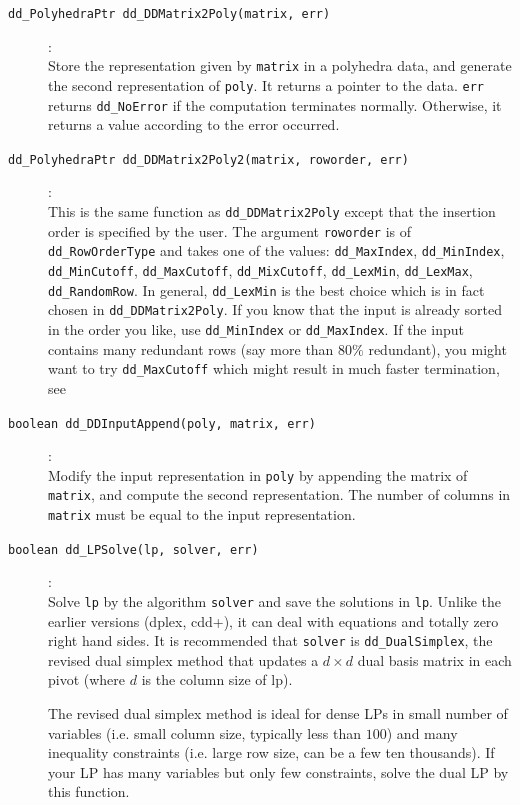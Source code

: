 \documentclass[11pt]{article}
\newcommand {\0} {{\bf 0}}
\begin{document}
\begin{description}
\item[{\tt dd\_PolyhedraPtr dd\_DDMatrix2Poly(matrix, err)}]:\\
Store the representation given by {\tt matrix} in a polyhedra data, and
generate the second representation of {\tt *poly}.  It returns
a pointer to the data. {\tt *err}
returns {\tt dd\_NoError} if the computation terminates normally.  Otherwise,
it returns a value according to the error occurred.

\item[{\tt dd\_PolyhedraPtr dd\_DDMatrix2Poly2(matrix, roworder, err)}]:\\
This is the same function as  {\tt dd\_DDMatrix2Poly} except that the insertion
order is specified by the user.  The argument {\tt roworder} is of {\tt dd\_RowOrderType}
and takes one of the values:
  {\tt dd\_MaxIndex}, {\tt dd\_MinIndex}, {\tt dd\_MinCutoff}, {\tt dd\_MaxCutoff}, {\tt dd\_MixCutoff},
   {\tt dd\_LexMin}, {\tt dd\_LexMax}, {\tt dd\_RandomRow}.   In general, {\tt dd\_LexMin} is
the best choice which is in fact chosen in {\tt dd\_DDMatrix2Poly}.  If you know that
the input is already sorted in the order you like, use  {\tt dd\_MinIndex} or  {\tt dd\_MaxIndex}.
If the input contains many redundant rows (say more than $80\%$ redundant),
you might want to try {\tt dd\_MaxCutoff} which might result in much faster termination,
see \cite{abs-hgach-97,fp-ddmr-96}

\item[{\tt boolean dd\_DDInputAppend(poly, matrix, err)}]:\\
Modify the input representation in {\tt *poly}
by appending the matrix of {\tt *matrix}, and compute
the second representation.  The number of columns in
{\tt *matrix} must be equal to the input representation.

\item[{\tt boolean dd\_LPSolve(lp, solver, err)}]:\\
Solve {\tt lp} by the algorithm {\tt solver} and save
the solutions in {\tt *lp}.  Unlike the earlier versions
(dplex, cdd+), it can deal with equations and totally zero right
hand sides.   It is recommended that {\tt solver} is
{\tt dd\_DualSimplex}, the revised dual simplex method
that updates a $d\times d$ dual basis matrix in each pivot (where
$d$ is the column size of lp).

The revised dual simplex method is ideal for dense LPs in small number of variables
(i.e. small column size, typically less than $100$)
and many inequality constraints (i.e. large row size, can be a few ten thousands).
If your LP has many variables but only few constraints, solve the dual LP by
this function.


\end{description}
\end{document}
